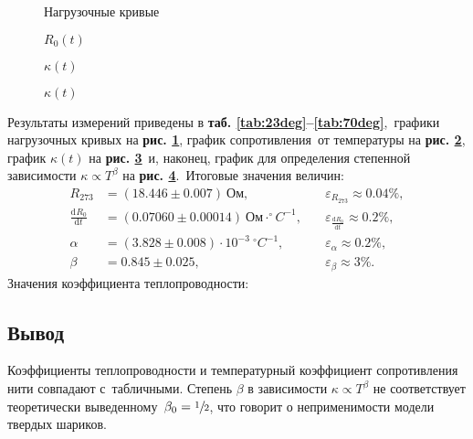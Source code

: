 \documentclass[a4paper, 12pt]{article}
\def \picdir{pic/}
\def \tbldir{tex/tables/}
\begin{document}
\begin{figure}[h!]
  \begin{center}
    
    \caption{Нагрузочные кривые}
    \label{fig:rq}
  \end{center}
\end{figure}

\begin{figure}[h!]
  \begin{center}
    
    \caption{$R_0(t)$}
    \label{fig:rt}
  \end{center}
\end{figure}

\begin{figure}[h!]
  \begin{center}
    
    \caption{$\kappa(t)$}
    \label{fig:kappa}
  \end{center}
\end{figure}

\begin{figure}[h!]
  \begin{center}
    
    \caption{$\kappa(t)$}
    \label{fig:beta}
  \end{center}
\end{figure}

\clearpage
Результаты измерений приведены в \textbf{таб. \ref{tab:23deg}--\ref{tab:70deg}},\
графики нагрузочных кривых на \textbf{рис. \ref{fig:rq}}, график сопротивления\
от температуры на \textbf{рис. \ref{fig:rt}}, график $\kappa(t)$ на \textbf{рис. \ref{fig:kappa}}\
и, наконец, график для определения степенной зависимости $\kappa \propto T^\beta$ на \textbf{рис. \ref{fig:beta}}.\
Итоговые значения величин:
\begin{align*}
  R_{273} &= (18.446 \pm 0.007)\ Ом,\quad &\varepsilon_{R_{273}} \approx 0.04\%,\\
  \frac{\mathrm{d}^{} R_0}{\mathrm{d} t^{}} &= (0.07060 \pm 0.00014)\ Ом \cdot ^\circ C^{-1},\quad &\varepsilon_{\frac{\mathrm{d}^{} R_0}{\mathrm{d} t^{}}} \approx 0.2\%,\\
  \alpha &= (3.828 \pm 0.008) \cdot 10^{-3}\ ^\circ C^{-1},\quad  &\varepsilon_{\alpha} \approx 0.2\%,\\
  \beta &= 0.845 \pm 0.025,\quad &\varepsilon_\beta \approx 3\%.
\end{align*}
Значения коэффициента теплопроводности:

\begin{table}[h!]
  \begin{center}
    
  \end{center}
\end{table}

\subsection*{{Вывод}}
Коэффициенты теплопроводности и температурный коэффициент сопротивления нити совпадают с\
табличными. Степень $\beta$ в зависимости $\kappa \propto T^\beta$ не соответствует теоретически выведенному\
$\beta_0 = \sfrac{1}{2}$, что говорит о неприменимости модели твердых шариков.
\end{document}
